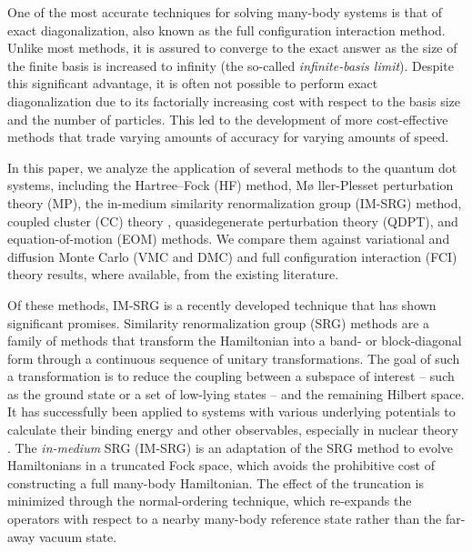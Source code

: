 One of the most accurate techniques for solving many-body systems is
that of exact diagonalization, also known as the full configuration
interaction method.  Unlike most methods, it is assured to converge to
the exact answer as the size of the finite basis is increased to
infinity (the so-called \textit{infinite-basis limit}).  Despite this
significant advantage, it is often not possible  to perform exact
diagonalization due to its factorially increasing cost with respect to
the basis size and the number of particles.  This led to the
development of more cost-effective methods that trade varying amounts
of accuracy for varying amounts of speed.

In this paper, we analyze the application of several methods to the
quantum dot systems, including the Hartree--Fock (HF) method, M\o
ller-Plesset perturbation theory (MP), the in-medium similarity
renormalization group (IM-SRG) method, coupled cluster (CC)
theory \cite{PhysRevB.67.045320,heidari:114708,PhysRevB.84.115302},
quasidegenerate perturbation theory (QDPT), and equation-of-motion
(EOM) methods.  We compare them against variational and diffusion
Monte Carlo (VMC and
DMC) \cite{PhysRevB.68.035304,PhysRevB.62.8120,PhysRevB.84.115302,PhysRevB.54.4780}
and full configuration interaction 
(FCI) theory \cite{olsen2013thesis,JJAP.36.3924,PhysRevB.56.6428,2008arXiv0810.2644K,rontani:124102}
results, where available,  from the existing literature.

Of these methods, IM-SRG is a recently developed technique that has
shown significant promises.  Similarity renormalization group (SRG)
methods are a family of methods that transform the Hamiltonian into a
band- or block-diagonal form through a continuous sequence of unitary
transformations.  The goal of such a transformation is to reduce the
coupling between a subspace of interest -- such as the ground state or
a set of low-lying states -- and the remaining Hilbert space.  It has
successfully been applied to systems with various underlying
potentials to calculate their binding energy and other observables,
especially in nuclear
theory \cite{ScottSRG,PhysRevC.75.061001,SRGThreeDim}.
The \emph{in-medium} SRG (IM-SRG) is an adaptation of the SRG method
to evolve Hamiltonians in a truncated Fock space, which avoids the
prohibitive cost of constructing a full many-body Hamiltonian.  The
effect of the truncation is minimized through the normal-ordering
technique, which re-expands the operators with respect to a nearby
many-body reference state rather than the far-away vacuum state.

